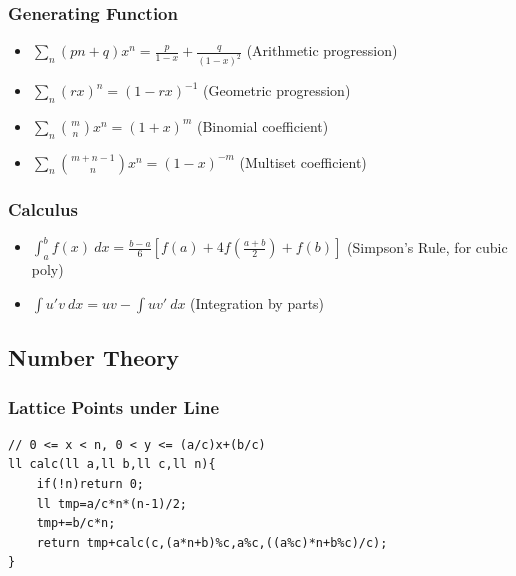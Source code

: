 \documentclass[landscape, 8pt, a4paper, oneside, twocolumn]{extarticle}
\begin{document}
\subsubsection{Generating Function}
\begin{itemize}
    \item $ \sum_{n} (pn + q)x^n = \frac{p}{1-x} + \frac{q}{(1-x)^2}$ (Arithmetic progression)
    \item $ \sum_{n} (rx)^n = (1 - rx)^{-1}$ (Geometric progression)
    \item $ \sum_{n} \binom{m}{n} x^n = (1+x)^m$ (Binomial coefficient)
    \item $ \sum_{n} \binom{m+n-1}{n} x^n = (1-x)^{-m}$ (Multiset coefficient)
\end{itemize}
\subsubsection{Calculus}
\begin{itemize}
    \item $\int_{a}^{b} f(x)\ dx = \frac{b-a}{6}\left[f(a) + 4f(\frac{a+b}{2}) + f(b)\right]$ (Simpson's Rule, for cubic poly)
    \item $\int u'v\ dx = uv - \int uv'\ dx$ (Integration by parts)
\end{itemize}
\subsection{Number Theory}
\subsubsection{Lattice Points under Line}
\begin{verbatim}
// 0 <= x < n, 0 < y <= (a/c)x+(b/c)
ll calc(ll a,ll b,ll c,ll n){
    if(!n)return 0;
    ll tmp=a/c*n*(n-1)/2;
    tmp+=b/c*n;
    return tmp+calc(c,(a*n+b)%c,a%c,((a%c)*n+b%c)/c);
}
\end{verbatim}
\end{document}

